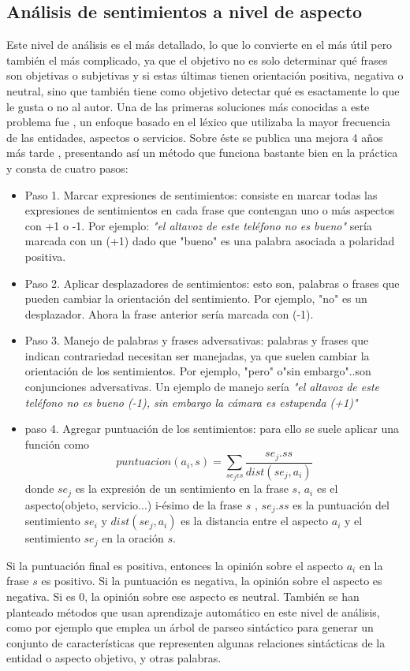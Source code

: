 \subsection{Análisis de sentimientos a nivel de aspecto}
Este nivel de análisis es el más detallado, lo que lo convierte en el más útil pero también el más complicado, ya que el objetivo no es solo determinar qué frases son objetivas o subjetivas y si estas últimas tienen orientación positiva, negativa o neutral, sino que también tiene como objetivo detectar qué es esactamente lo que le gusta o no al autor. \newline
Una de las primeras soluciones más conocidas a este problema fue \citet{hu2004mining}, un enfoque basado en el léxico que utilizaba la mayor frecuencia de las entidades, aspectos o servicios. Sobre éste se publica una mejora 4 años más tarde \citet{ding2008holistic}, presentando así un método que funciona bastante bien en la práctica y consta de cuatro pasos:
\begin{itemize}
\item Paso 1. Marcar expresiones de sentimientos: consiste en marcar todas las expresiones de sentimientos en cada frase que contengan uno o más aspectos con +1 o -1. Por ejemplo: \textsl{"el altavoz de este teléfono no es bueno"} sería marcada con un (+1) dado que "bueno" es una palabra asociada a polaridad positiva.
\item Paso 2. Aplicar desplazadores de sentimientos: esto son, palabras o frases que pueden cambiar la orientación del sentimiento. Por ejemplo, "no" es un desplazador. Ahora la frase anterior sería marcada con (-1).
\item Paso 3. Manejo de palabras y frases adversativas: palabras y frases que indican contrariedad necesitan ser manejadas, ya que suelen cambiar la orientación de los sentimientos. Por ejemplo, "pero" o"sin embargo"..son conjunciones adversativas. Un ejemplo de manejo sería \textsl{"el altavoz de este teléfono no es bueno (-1), sin embargo la cámara es estupenda (+1)"}
\item paso 4. Agregar puntuación de los sentimientos: para ello se suele aplicar una función como 
\[puntuacion(a_{i},s)=\sum_{se_{j}\epsilon s}{}\frac{se_{j}.ss}{dist(se_{j},a_{i})}\]
donde $se_{j}$ es la expresión de un sentimiento en la frase $s$, $a_{i}$ es el aspecto(objeto, servicio...) i-ésimo de la frase $s$ , $se_{j}.ss$ es la puntuación del sentimiento $se_{i}$  y $dist(se_{j},a_{i})$ es la distancia entre el aspecto $a_{i}$ y el sentimiento $se_{j}$ en la oración $s$.
\end{itemize}  
Si la puntuación final es positiva, entonces la opinión sobre el aspecto $a_{i}$ en la frase $s$ es positivo. Si la puntuación es negativa, la opinión sobre el aspecto es negativa. Si es 0, la opinión sobre ese aspecto es neutral.\newline
También se han planteado métodos que usan aprendizaje automático en este nivel de análisis, como por ejemplo \citet{jiang2011target} que emplea un árbol de parseo sintáctico para generar un conjunto de características que representen algunas relaciones sintácticas de la entidad o aspecto objetivo, y otras palabras. 


